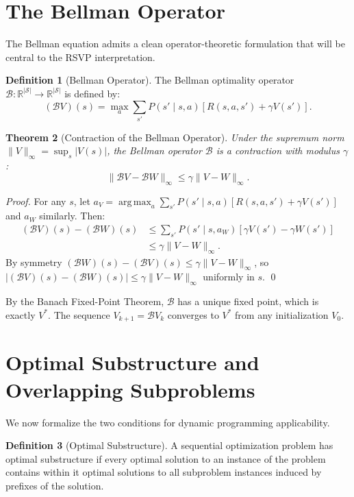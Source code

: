 \documentclass[12pt, a4paper, openany]{book}
\theoremstyle{plain}
\newtheorem{theorem}{Theorem}[chapter]
\theoremstyle{definition}
\newtheorem{definition}[theorem]{Definition}
\theoremstyle{remark}
\newcommand{\BellmanOp}{\mathcal{B}}
\newcommand{\argmax}{\operatorname{arg\,max}}
\begin{document}
\section{The Bellman Operator}

The Bellman equation admits a clean operator-theoretic formulation that will be central to the RSVP interpretation.

\begin{definition}[Bellman Operator]
The Bellman optimality operator $\BellmanOp: \mathbb{R}^{|\mathcal{S}|} \to \mathbb{R}^{|\mathcal{S}|}$ is defined by:
\[
(\BellmanOp V)(s) = \max_a \sum_{s'} P(s' \mid s, a)\left[R(s,a,s') + \gamma V(s')\right].
\]
\end{definition}

\begin{theorem}[Contraction of the Bellman Operator]
Under the supremum norm $\|V\|_\infty = \sup_s |V(s)|$, the Bellman operator $\BellmanOp$ is a contraction with modulus $\gamma$:
\[
\|\BellmanOp V - \BellmanOp W\|_\infty \leq \gamma \|V - W\|_\infty.
\]
\end{theorem}

\begin{proof}
For any $s$, let $a_V = \argmax_a \sum_{s'} P(s' \mid s,a)[R(s,a,s') + \gamma V(s')]$ and $a_W$ similarly. Then:
\begin{align*}
(\BellmanOp V)(s) - (\BellmanOp W)(s) &\leq \sum_{s'} P(s' \mid s, a_W)\left[\gamma V(s') - \gamma W(s')\right]\\
&\leq \gamma \|V - W\|_\infty.
\end{align*}
By symmetry $(\BellmanOp W)(s) - (\BellmanOp V)(s) \leq \gamma \|V - W\|_\infty$, so $|(\BellmanOp V)(s) - (\BellmanOp W)(s)| \leq \gamma \|V-W\|_\infty$ uniformly in $s$. \qed
\end{proof}

By the Banach Fixed-Point Theorem, $\BellmanOp$ has a unique fixed point, which is exactly $V^*$. The sequence $V_{k+1} = \BellmanOp V_k$ converges to $V^*$ from any initialization $V_0$.

\section{Optimal Substructure and Overlapping Subproblems}

We now formalize the two conditions for dynamic programming applicability.

\begin{definition}[Optimal Substructure]
A sequential optimization problem has optimal substructure if every optimal solution to an instance of the problem contains within it optimal solutions to all subproblem instances induced by prefixes of the solution.
\end{definition}
\end{document}
